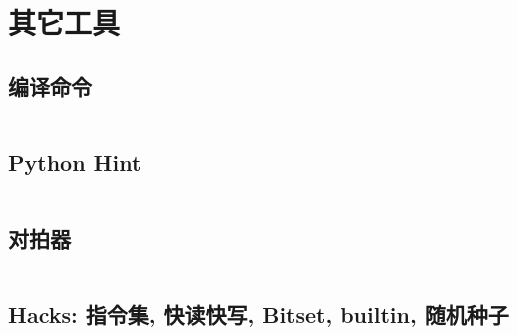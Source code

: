 \section{其它工具}

\subsection{编译命令}
\inputminted{sh}{sections/OtherTools/assets/Miscellany/compile.sh}

\subsection{Python Hint}
\inputminted{python}{sections/OtherTools/assets/Miscellany/py.py}

\subsection{对拍器}
\inputminted{python}{sections/OtherTools/assets/Miscellany/stress.py}

\subsection{Hacks: 指令集, 快读快写, Bitset, builtin, 随机种子}
\inputminted{cpp}{sections/OtherTools/assets/Miscellany/hack.cpp}
